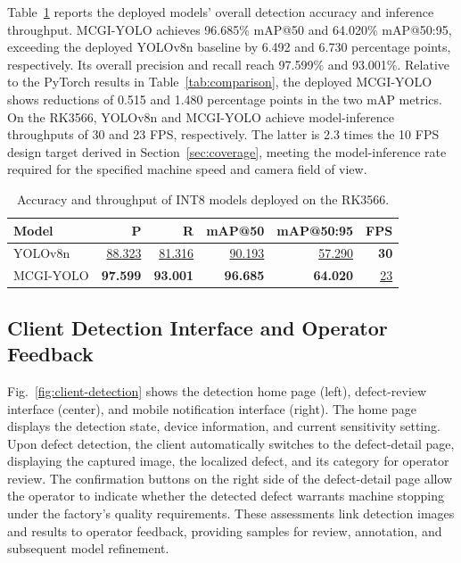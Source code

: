 \documentclass[journal]{IEEEtranTIE}
\newcommand{\model}{MCGI-YOLO\xspace}
\begin{document}
Table~\ref{tab:rknn-deployment} reports the deployed models' overall detection accuracy and inference throughput. \model achieves 96.685\% mAP@50 and 64.020\% mAP@50:95, exceeding the deployed YOLOv8n baseline by 6.492 and 6.730 percentage points, respectively. Its overall precision and recall reach 97.599\% and 93.001\%. Relative to the PyTorch results in Table~\ref{tab:comparison}, the deployed \model shows reductions of 0.515 and 1.480 percentage points in the two mAP metrics. On the RK3566, YOLOv8n and \model achieve model-inference throughputs of 30 and 23 FPS, respectively. The latter is 2.3 times the 10 FPS design target derived in Section~\ref{sec:coverage}, meeting the model-inference rate required for the specified machine speed and camera field of view.

\begin{table}[!htbp]
\caption{Accuracy and throughput of INT8 models deployed on the RK3566.}
\label{tab:rknn-deployment}
\centering
\footnotesize
\setlength{\tabcolsep}{2pt}
\renewcommand{\arraystretch}{1.08}
\begin{tabular*}{\columnwidth}{@{\extracolsep{\fill}}lrrrrr@{}}
\toprule
Model & P & R & mAP@50 & mAP@50:95 & FPS \\
\midrule
YOLOv8n & \underline{88.323} & \underline{81.316} & \underline{90.193} & \underline{57.290} & \textbf{30} \\
\model & \textbf{97.599} & \textbf{93.001} & \textbf{96.685} & \textbf{64.020} & \underline{23} \\
\bottomrule
\end{tabular*}
\renewcommand{\arraystretch}{1.0}
\end{table}

\subsection{Client Detection Interface and Operator Feedback}
\label{sec:client-interface}
Fig.~\ref{fig:client-detection} shows the detection home page (left), defect-review interface (center), and mobile notification interface (right). The home page displays the detection state, device information, and current sensitivity setting. Upon defect detection, the client automatically switches to the defect-detail page, displaying the captured image, the localized defect, and its category for operator review. The confirmation buttons on the right side of the defect-detail page allow the operator to indicate whether the detected defect warrants machine stopping under the factory's quality requirements. These assessments link detection images and results to operator feedback, providing samples for review, annotation, and subsequent model refinement.
\end{document}
